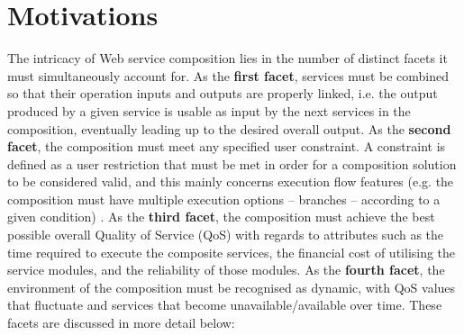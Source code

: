 \section{Motivations}
The intricacy of Web service composition lies in the number of distinct facets it must simultaneously account for. As
the \textbf{first facet}, services must be combined so that their operation inputs and outputs are properly linked, i.e. the output
produced by a given service is usable as input by the next services in the composition, eventually leading up to the desired overall
output. As the \textbf{second facet}, the composition must meet any specified user constraint. A constraint is defined as a user restriction that must
be met in order for a composition solution to be considered valid, and this mainly concerns execution flow features (e.g. the composition must have
multiple execution options -- branches -- according to a given condition) \cite{wang2014automated,sohrabi2009web,karakoc2009composing}. As the \textbf{third facet}, the composition must achieve the best possible overall Quality of Service (QoS) with regards to attributes such as the time required to execute the composite services, the
financial cost of utilising the service modules, and the reliability of those modules. As the \textbf{fourth facet}, the environment of the composition must be recognised as dynamic, with QoS values that fluctuate and services that become unavailable/available over time. These facets are discussed in more detail below:

